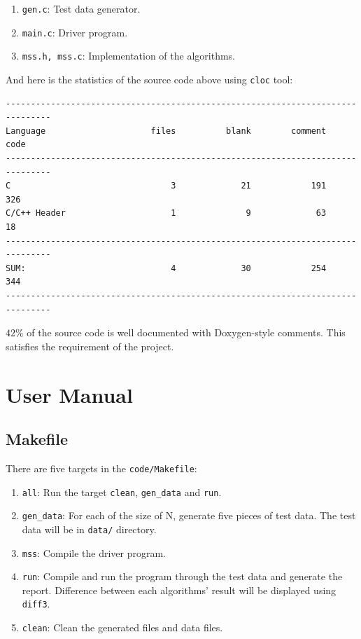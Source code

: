 \documentclass[a4paper,oneside]{book}
\begin{document}
\begin{enumerate}
    \item \verb|gen.c|: Test data generator.
    \item \verb|main.c|: Driver program.
    \item \verb|mss.h, mss.c|: Implementation of the algorithms.
\end{enumerate}

And here is the statistics of the source code above using \verb|cloc| tool:

\begin{verbatim}
-------------------------------------------------------------------------------
Language                     files          blank        comment           code
-------------------------------------------------------------------------------
C                                3             21            191            326
C/C++ Header                     1              9             63             18
-------------------------------------------------------------------------------
SUM:                             4             30            254            344
-------------------------------------------------------------------------------
\end{verbatim}

$42\%$ of the source code is well documented with Doxygen-style comments. This
satisfies the requirement of the project.


\chapter{User Manual}

\section{Makefile}

There are five targets in the \verb|code/Makefile|:

\begin{enumerate}
    \item \verb|all|: Run the target \verb|clean|, \verb|gen_data| and \verb|run|.
    \item \verb|gen_data|: For each of the size of N, generate five pieces of test data.
          The test data will be in \verb|data/| directory.
    \item \verb|mss|: Compile the driver program.
    \item \verb|run|: Compile and run the program through the test data and generate the report.
          Difference between each algorithms' result will be displayed using \verb|diff3|.
    \item \verb|clean|: Clean the generated files and data files.
\end{enumerate}
\end{document}
